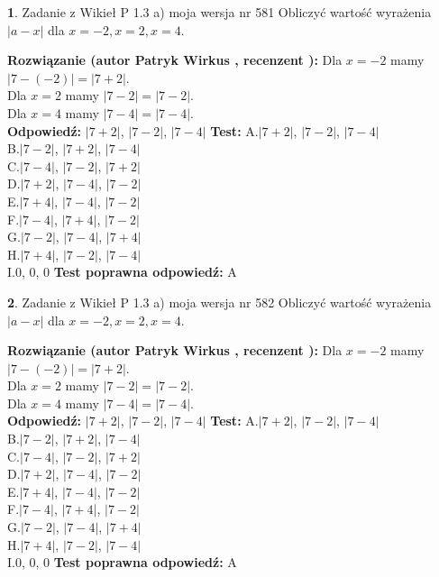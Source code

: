 \documentclass[12pt, a4paper]{article}
\theoremstyle{definition} %
\newtheorem{zad}{}
\newcommand{\zadStart}[1]{\begin{zad}#1\newline}
\newcommand{\zadStop}{\end{zad}}
\newcommand{\rozwStart}[2]{\noindent \textbf{Rozwiązanie (autor #1 , recenzent #2): }\newline}
\newcommand{\rozwStop}{\newline}
\newcommand{\odpStart}{\noindent \textbf{Odpowiedź:}\newline}
\newcommand{\odpStop}{\newline}
\newcommand{\testStart}{\noindent \textbf{Test:}\newline}
\newcommand{\testStop}{\newline}
\newcommand{\kluczStart}{\noindent \textbf{Test poprawna odpowiedź:}\newline}
\newcommand{\kluczStop}{\newline}
\begin{document}
\zadStart{Zadanie z Wikieł P 1.3 a) moja wersja nr 581}
Obliczyć wartość wyrażenia $|a - x|$ dla $x=-2,x=2,x=4$.
\zadStop
\rozwStart{Patryk Wirkus}{}
Dla $x = -2$ mamy $|7 - (-2)| = |7 + 2|$.\\
Dla $x = 2$ mamy $|7 - 2| = |7 - 2|$.\\
Dla $x = 4$ mamy $|7 - 4| = |7 - 4|$.\\
\rozwStop
\odpStart
$|7 + 2|$, $|7 - 2|$, $|7 - 4|$
\odpStop
\testStart
A.$|7 + 2|$, $|7 - 2|$, $|7 - 4|$\\
B.$|7 - 2|$, $|7 + 2|$, $|7 - 4|$\\
C.$|7 - 4|$, $|7 - 2|$, $|7 + 2|$\\
D.$|7 + 2|$, $|7 - 4|$, $|7 - 2|$\\
E.$|7 + 4|$, $|7 - 4|$, $|7 - 2|$\\
F.$|7 - 4|$, $|7 + 4|$, $|7 - 2|$\\
G.$|7 - 2|$, $|7 - 4|$, $|7 + 4|$\\
H.$|7 + 4|$, $|7 - 2|$, $|7 - 4|$\\
I.$0$, $0$, $0$
\testStop
\kluczStart
A
\kluczStop



\zadStart{Zadanie z Wikieł P 1.3 a) moja wersja nr 582}
Obliczyć wartość wyrażenia $|a - x|$ dla $x=-2,x=2,x=4$.
\zadStop
\rozwStart{Patryk Wirkus}{}
Dla $x = -2$ mamy $|7 - (-2)| = |7 + 2|$.\\
Dla $x = 2$ mamy $|7 - 2| = |7 - 2|$.\\
Dla $x = 4$ mamy $|7 - 4| = |7 - 4|$.\\
\rozwStop
\odpStart
$|7 + 2|$, $|7 - 2|$, $|7 - 4|$
\odpStop
\testStart
A.$|7 + 2|$, $|7 - 2|$, $|7 - 4|$\\
B.$|7 - 2|$, $|7 + 2|$, $|7 - 4|$\\
C.$|7 - 4|$, $|7 - 2|$, $|7 + 2|$\\
D.$|7 + 2|$, $|7 - 4|$, $|7 - 2|$\\
E.$|7 + 4|$, $|7 - 4|$, $|7 - 2|$\\
F.$|7 - 4|$, $|7 + 4|$, $|7 - 2|$\\
G.$|7 - 2|$, $|7 - 4|$, $|7 + 4|$\\
H.$|7 + 4|$, $|7 - 2|$, $|7 - 4|$\\
I.$0$, $0$, $0$
\testStop
\kluczStart
A
\kluczStop
\end{document}
